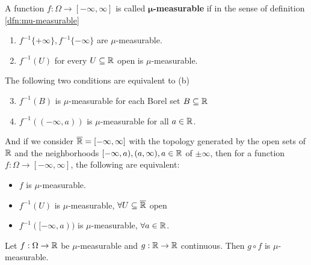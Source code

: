 \begin{dfn}[]
  A function $f: \Omega \to [-\infty,\infty]$ is called \textbf{$\bm{\mu}$-measurable} if in the sense of definition \ref{dfn:mu-measurable}
  \begin{enumerate}
    \item $f^{-1} \{+ \infty\}, f^{-1}\{-\infty\}$ are $\mu$-measurable.
    \item$f^{-1}(U)$ for every $U \subseteq \mathbb{R}$ open is $\mu$-measurable.
  \end{enumerate}
\end{dfn}

\begin{rem}[]
  The following two conditions are equivalent to (b)
\begin{enumerate}
  \setcounter{enumi}{2}
  \item $f^{-1}(B)$ is $\mu$-measurable for each Borel set $B \subseteq \mathbb{R}$
  \item $f^{-1}((-\infty,a))$ is $\mu$-measurable for all $a \in \mathbb{R}$.
\end{enumerate}


And if we consider $\overline{\mathbb{R}} = [-\infty,\infty]$ with the topology generated by the open sets of $\mathbb{R}$ and the neighborhoods $[-\infty,a), (a,\infty), a \in \mathbb{R}$ of $\pm \infty$,
then for a function
$f: \Omega \to [-\infty,\infty]$,
the following are equivalent:
\begin{itemize}
  \item $f$ is $\mu$-measurable.
  \item $f^{-1}(U)$ is $\mu$-measurable, $\forall  U \subseteq \overline{\mathbb{R}}$ open
  \item $f^{-1}([-\infty,a))$ is $\mu$-measurable, $\forall  a \in \mathbb{R}$.
\end{itemize}
\end{rem}

\begin{ex}[]
Let $f: \Omega \to \mathbb{R}$ be $\mu$-measurable and $g: \mathbb{R} \to \mathbb{R}$ continuous. Then $g \circ f$ is $\mu$-measurable.
\end{ex}



